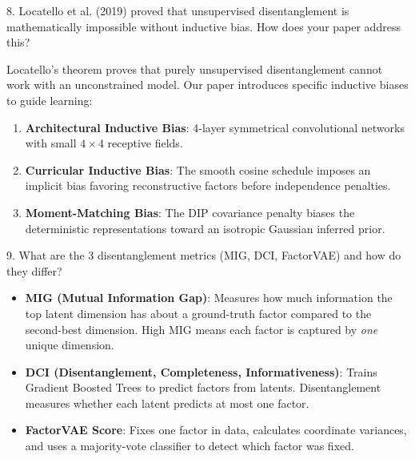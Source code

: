 \documentclass[11pt,a4paper]{article}
\begin{document}
\begin{questionbox}{8. Locatello et al. (2019) proved that unsupervised disentanglement is mathematically impossible without inductive bias. How does your paper address this?}
\begin{answerbox}
Locatello's theorem proves that purely unsupervised disentanglement cannot work with an unconstrained model. Our paper introduces specific inductive biases to guide learning:
\begin{enumerate}[noitemsep]
    \item \textbf{Architectural Inductive Bias}: 4-layer symmetrical convolutional networks with small $4\times 4$ receptive fields.
    \item \textbf{Curricular Inductive Bias}: The smooth cosine schedule imposes an implicit bias favoring reconstructive factors before independence penalties.
    \item \textbf{Moment-Matching Bias}: The DIP covariance penalty biases the deterministic representations toward an isotropic Gaussian inferred prior.
\end{enumerate}
\end{answerbox}
\end{questionbox}

\begin{questionbox}{9. What are the 3 disentanglement metrics (MIG, DCI, FactorVAE) and how do they differ?}
\begin{answerbox}
\begin{itemize}[noitemsep]
    \item \textbf{MIG (Mutual Information Gap)}: Measures how much information the top latent dimension has about a ground-truth factor compared to the second-best dimension. High MIG means each factor is captured by \textit{one} unique dimension.
    \item \textbf{DCI (Disentanglement, Completeness, Informativeness)}: Trains Gradient Boosted Trees to predict factors from latents. Disentanglement measures whether each latent predicts at most one factor.
    \item \textbf{FactorVAE Score}: Fixes one factor in data, calculates coordinate variances, and uses a majority-vote classifier to detect which factor was fixed.
\end{itemize}
\end{answerbox}
\end{questionbox}
\end{document}
